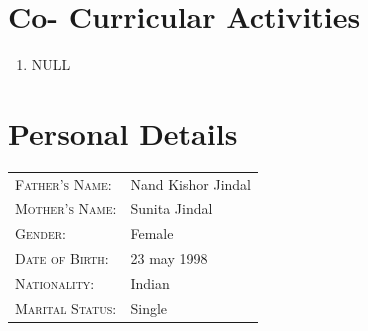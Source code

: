 \documentclass{article}
\begin{document}
\section{Co- Curricular Activities}
\begin{enumerate}
\item{  NULL}
\end{enumerate}
\section{Personal Details}
\begin{tabular}{ll}\\
\textsc{Father's Name: }& Nand Kishor Jindal\\
\textsc{Mother's Name: }&Sunita Jindal\\
\textsc{Gender: }&Female\\
\textsc{Date of Birth: }&23 may 1998\\
\textsc{Nationality: }&Indian\\
\textsc{Marital Status: }& Single\\
\end{tabular}
\end{document}
